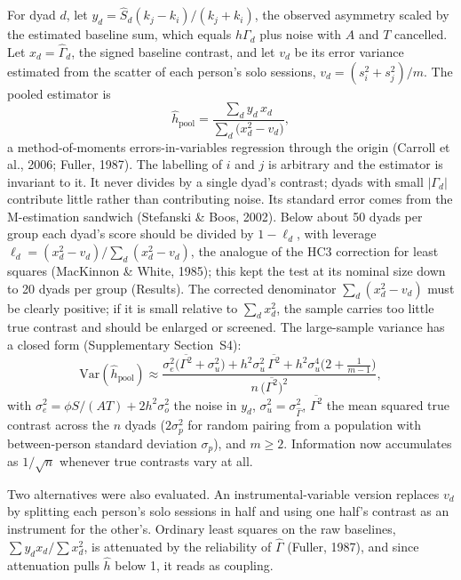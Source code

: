 \documentclass[12pt]{article}
\newcommand{\ki}{k_i}
\newcommand{\kj}{k_j}
\begin{document}
For dyad $d$, let $y_d=\hat S_d(\kj-\ki)/(\kj+\ki)$, the observed asymmetry scaled
by the estimated baseline sum, which equals $h\Gamma_d$ plus noise with $A$ and $T$
cancelled. Let $x_d=\hat\Gamma_d$, the signed baseline contrast, and let $v_d$ be
its error variance estimated from the scatter of each person's solo sessions,
$v_d=(s_i^2+s_j^2)/m$. The pooled estimator is
\begin{equation}\label{eq:pooled}
\hat h_{\mathrm{pool}}=\frac{\sum_d y_d\,x_d}{\sum_d\bigl(x_d^2-v_d\bigr)} ,
\end{equation}
a method-of-moments errors-in-variables regression through the origin (Carroll
et al., 2006; Fuller, 1987). The labelling of $i$ and $j$ is arbitrary and the
estimator is invariant to it. It never divides by a single dyad's contrast;
dyads with small $|\Gamma_d|$ contribute little rather than contributing noise.
Its standard error comes from the M-estimation sandwich (Stefanski \& Boos, 2002).
Below about 50 dyads per group each dyad's score should be divided by $1-\ell_d$,
with leverage $\ell_d=(x_d^2-v_d)/\sum_d(x_d^2-v_d)$, the analogue of the HC3
correction for least squares (MacKinnon \& White, 1985); this kept the test at its
nominal size down to 20 dyads per group (Results). The corrected denominator
$\sum_d(x_d^2-v_d)$ must be clearly positive; if it is small relative to
$\sum_dx_d^2$, the sample carries too little true contrast and should be enlarged or
screened. The large-sample variance has a closed form (Supplementary Section~S4):
\begin{equation}\label{eq:pooledvar}
\mathrm{Var}(\hat h_{\mathrm{pool}})\approx
\frac{\sigma_e^2\bigl(\overline{\Gamma^2}+\sigma_u^2\bigr)+h^2\sigma_u^2\,\overline{\Gamma^2}
+h^2\sigma_u^4\bigl(2+\tfrac{1}{m-1}\bigr)}{n\,\bigl(\overline{\Gamma^2}\bigr)^2},
\end{equation}
with $\sigma_e^2=\phi S/(AT)+2h^2\sigma_o^2$ the noise in $y_d$,
$\sigma_u^2=\sigma_{\hat\Gamma}^2$, $\overline{\Gamma^2}$ the mean squared true
contrast across the $n$ dyads ($2\sigma_p^2$ for random pairing from a population
with between-person standard deviation $\sigma_p$), and $m\geq2$. Information now
accumulates as $1/\sqrt n$ whenever true contrasts vary at all.

Two alternatives were also evaluated. An instrumental-variable version replaces
$v_d$ by splitting each person's solo sessions in half and using one half's
contrast as an instrument for the other's. Ordinary least squares on the raw
baselines, $\sum y_dx_d/\sum x_d^2$, is attenuated by the reliability of
$\hat\Gamma$ (Fuller, 1987), and since attenuation pulls $\hat h$ below 1, it
reads as coupling.
\end{document}
